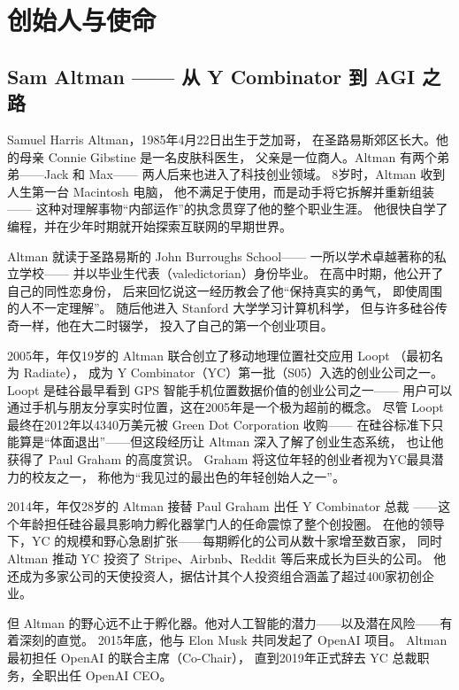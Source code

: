 \section{创始人与使命}
\label{sec:openai-founders}

\subsection{Sam Altman —— 从 Y Combinator 到 AGI 之路}
\label{subsec:sam-altman}

Samuel Harris Altman，1985年4月22日出生于芝加哥，
在圣路易斯郊区长大。他的母亲 Connie Gibstine 是一名皮肤科医生，
父亲是一位商人。Altman 有两个弟弟——Jack 和 Max——
两人后来也进入了科技创业领域。
8岁时，Altman 收到人生第一台 Macintosh 电脑，
他不满足于使用，而是动手将它拆解并重新组装——
这种对理解事物``内部运作''的执念贯穿了他的整个职业生涯。
他很快自学了编程，并在少年时期就开始探索互联网的早期世界。

Altman 就读于圣路易斯的 John Burroughs School——
一所以学术卓越著称的私立学校——
并以毕业生代表（valedictorian）身份毕业。
在高中时期，他公开了自己的同性恋身份，
后来回忆说这一经历教会了他``保持真实的勇气，
即使周围的人不一定理解''。
随后他进入 Stanford 大学学习计算机科学，
但与许多硅谷传奇一样，他在大二时辍学，
投入了自己的第一个创业项目。

2005年，年仅19岁的 Altman 联合创立了移动地理位置社交应用 Loopt
（最初名为 Radiate），
成为 Y Combinator（YC）第一批（S05）入选的创业公司之一。
Loopt 是硅谷最早看到 GPS 智能手机位置数据价值的创业公司之一——
用户可以通过手机与朋友分享实时位置，这在2005年是一个极为超前的概念。
尽管 Loopt 最终在2012年以4340万美元被 Green Dot Corporation 收购——
在硅谷标准下只能算是``体面退出''——但这段经历让 Altman 深入了解了创业生态系统，
也让他获得了 Paul Graham 的高度赏识。
Graham 将这位年轻的创业者视为YC最具潜力的校友之一，
称他为``我见过的最出色的年轻创始人之一''。

2014年，年仅28岁的 Altman 接替 Paul Graham 出任 Y Combinator 总裁
——这个年龄担任硅谷最具影响力孵化器掌门人的任命震惊了整个创投圈。
在他的领导下，YC 的规模和野心急剧扩张——每期孵化的公司从数十家增至数百家，
同时 Altman 推动 YC 投资了 Stripe、Airbnb、Reddit 等后来成长为巨头的公司。
他还成为多家公司的天使投资人，据估计其个人投资组合涵盖了超过400家初创企业。

但 Altman 的野心远不止于孵化器。他对人工智能的潜力——以及潜在风险——有着深刻的直觉。
2015年底，他与 Elon Musk 共同发起了 OpenAI 项目。
Altman 最初担任 OpenAI 的联合主席（Co-Chair），
直到2019年正式辞去 YC 总裁职务，全职出任 OpenAI CEO。

